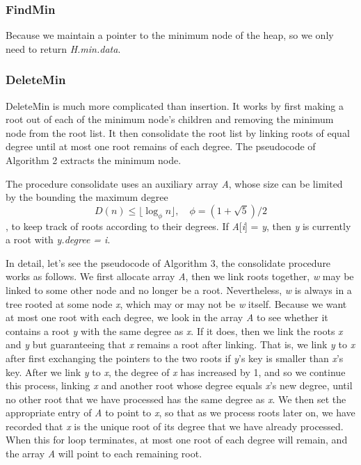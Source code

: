\documentclass[12pt]{article}
\begin{document}
    \subsubsection{FindMin}
    Because we maintain a pointer to the minimum node of the heap, 
    so we only need to return \emph{H.min.data}.
    \subsubsection{DeleteMin}
    DeleteMin is much more complicated than insertion. It works by first making a root
    out of each of the minimum node’s children and removing the minimum node from
    the root list. It then consolidate the root list by linking roots of equal degree until
    at most one root remains of each degree. The pseudocode of Algorithm 2 extracts the minimum node.
    
    The procedure consolidate uses an auxiliary array \emph{A}, whose size can be limited by the bounding the maximum degree
    $$D(n) \le \lfloor\log_{\phi}n\rfloor,\quad \phi = (1 + \sqrt{5}) / 2$$
    , to keep track of roots according to their degrees. If \emph{A}[\emph{i}] = \emph{y}, then \emph{y} is currently a root
    with \emph{y.degree = i}.

    In detail, let's see the pseudocode of Algorithm 3, the consolidate procedure works as follows. 
    We first allocate array \emph{A}, then we link roots together, \emph{w} may be linked
    to some other node and no longer be a root. Nevertheless, \emph{w} is always in a tree
    rooted at some node \emph{x}, which may or may not be \emph{w} itself. Because we want at
    most one root with each degree, we look in the array \emph{A} to see whether it contains
    a root \emph{y} with the same degree as \emph{x}. If it does, then we link the roots \emph{x} and \emph{y} but
    guaranteeing that \emph{x} remains a root after linking. That is, we link \emph{y} to \emph{x} after first
    exchanging the pointers to the two roots if \emph{y}’s key is smaller than \emph{x}’s key. After
    we link \emph{y} to \emph{x}, the degree of \emph{x} has increased by 1, and so we continue this process,
    linking \emph{x} and another root whose degree equals \emph{x}’s new degree, until no other root
    that we have processed has the same degree as \emph{x}. We then set the appropriate entry
    of \emph{A} to point to \emph{x}, so that as we process roots later on, we have recorded that \emph{x} is
    the unique root of its degree that we have already processed. When this for loop
    terminates, at most one root of each degree will remain, and the array \emph{A} will point
    to each remaining root.
\end{document}
